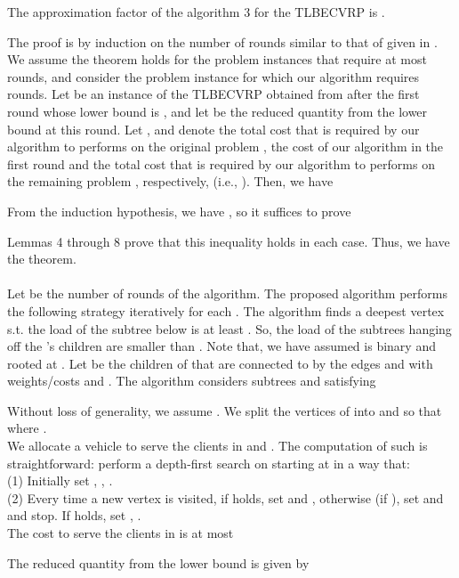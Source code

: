 \begin{theorem} The approximation factor of the algorithm 3 for the TLBECVRP is .
\end{theorem}
\noindent  The proof is by induction on the number of rounds similar to that of given in \cite{Asano2001,Naoki}. We assume the theorem holds for the problem instances that require at most  rounds, and consider the problem instance  for which our algorithm requires  rounds. Let  be an instance of the TLBECVRP obtained from  after the first round whose lower bound is , and let  be the reduced quantity from the lower bound at this round. Let ,  and  denote the total cost that is required by our algorithm to performs on the original problem , the cost of our algorithm in the first round and the total cost that is required by our algorithm to performs on the remaining problem , respectively, (i.e., ). Then, we have

\noindent From the induction hypothesis, we have , so it suffices to prove

\noindent Lemmas 4 through 8 prove that this inequality holds in each case. Thus, we have the theorem. \\
\\

\indent Let  be the number of rounds of the algorithm. The proposed algorithm performs the following strategy iteratively for each . The algorithm finds a deepest vertex  s.t. the load of the subtree  below  is at least . So, the load of the subtrees hanging off the 's children are smaller than . Note that, we have assumed  is binary and rooted at . Let  be the children of  that are connected to  by the edges  and  with weights/costs  and . The algorithm considers subtrees  and  satisfying 

\noindent Without loss of generality, we assume . We split the vertices  of  into  and  so that  where .\\
\indent  We allocate a vehicle to serve the clients in  and . The computation of such  is straightforward: perform a depth-first search on  starting at  in a way that:\\
\noindent (1) Initially set , , .\\
\noindent (2) Every time a new vertex  is visited, if  holds, set  and , otherwise (if ), set  and  and stop. If  holds, set , .\\
\indent The cost to serve the clients in  is at most

\noindent The reduced quantity from the lower bound is given by

